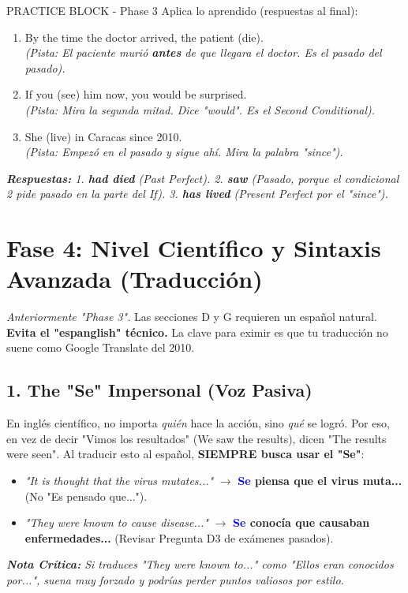 \documentclass[11pt,a4paper]{article}
\begin{document}
\begin{hackbox}{PRACTICE BLOCK - Phase 3}
    Aplica lo aprendido (respuestas al final):
    \begin{enumerate}
        \item By the time the doctor arrived, the patient \underline{\hspace{2cm}} (die). \\ \textit{(Pista: El paciente murió \textbf{antes} de que llegara el doctor. Es el pasado del pasado).}
        \item If you \underline{\hspace{2cm}} (see) him now, you would be surprised. \\ \textit{(Pista: Mira la segunda mitad. Dice "would". Es el Second Conditional).}
        \item She \underline{\hspace{2cm}} (live) in Caracas since 2010. \\ \textit{(Pista: Empezó en el pasado y sigue ahí. Mira la palabra "since").}
    \end{enumerate}
\end{hackbox}
\vspace{0.3cm}
\textit{\textbf{Respuestas:} 1. \textbf{had died} (Past Perfect). 2. \textbf{saw} (Pasado, porque el condicional 2 pide pasado en la parte del If). 3. \textbf{has lived} (Present Perfect por el "since").}

\vspace{0.4cm}

\section{Fase 4: Nivel Científico y Sintaxis Avanzada (Traducción)}
\textit{Anteriormente "Phase 3".} Las secciones D y G requieren un español natural. \textbf{Evita el "espanglish" técnico.} La clave para eximir es que tu traducción no suene como Google Translate del 2010.

\subsection{1. The "Se" Impersonal (Voz Pasiva)}
En inglés científico, no importa \textit{quién} hace la acción, sino \textit{qué} se logró. Por eso, en vez de decir "Vimos los resultados" (We saw the results), dicen "The results were seen". Al traducir esto al español, \textbf{SIEMPRE busca usar el "Se"}:
\begin{itemize}
    \item \textit{"It is thought that the virus mutates..."} $\to$ \textbf{\textcolor{blue}{Se} piensa que el virus muta...} (No "Es pensado que...").
    \item \textit{"They were known to cause disease..."} $\to$ \textbf{\textcolor{blue}{Se} conocía que causaban enfermedades...} (Revisar Pregunta D3 de exámenes pasados).
\end{itemize}
\textit{\textbf{Nota Crítica:} Si traduces "They were known to..." como "Ellos eran conocidos por...", suena muy forzado y podrías perder puntos valiosos por estilo.}
\end{document}
